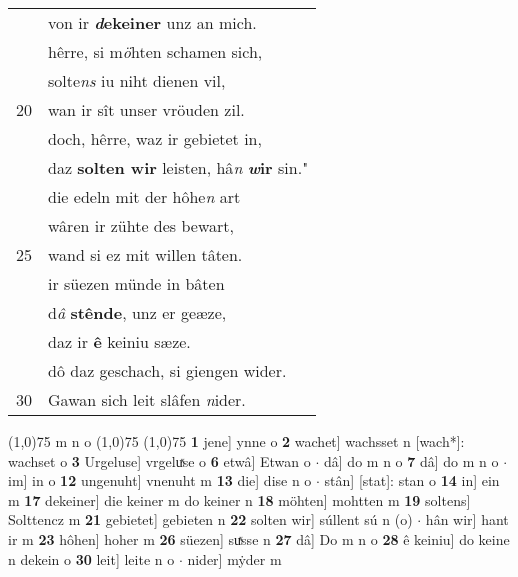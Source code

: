 \documentclass[8pt,a4paper,notitlepage]{article}
\begin{document}
\begin{table}[ht]
\begin{minipage}[t]{0.5\linewidth}
\begin{tabular}{rl}
 & von ir \textbf{\textit{d}ekeiner} unz an mich.\\ 
 & hêrre, si m\textit{ö}hten schamen sich,\\ 
 & solte\textit{ns} iu niht dienen vil,\\ 
20 & wan ir sît unser vröuden zil.\\ 
 & doch, hêrre, waz ir gebietet in,\\ 
 & daz \textbf{solten wir} leisten, hâ\textit{n} \textbf{\textit{w}ir} sin."\\ 
 & die edeln mit der hôhe\textit{n} art\\ 
 & wâren ir zühte des bewart,\\ 
25 & wand si ez mit willen tâten.\\ 
 & ir süezen münde in bâten\\ 
 & d\textit{â} \textbf{stênde}, unz er geæze,\\ 
 & daz ir \textbf{ê} keiniu sæze.\\ 
 & dô daz geschach, si giengen wider.\\ 
30 & Gawan sich leit slâfen \textit{n}ider.\\ 
\end{tabular}
\scriptsize
\line(1,0){75} \newline
m n o \newline
\line(1,0){75} \newline
\newline
\line(1,0){75} \newline
\textbf{1} jene] ynne o \textbf{2} wachet] wachsset n [wach*]: wachset o \textbf{3} Urgeluse] vrgeluͯse o \textbf{6} etwâ] Etwan o  $\cdot$ dâ] do m n o \textbf{7} dâ] do m n o  $\cdot$ im] in o \textbf{12} ungenuht] vnenuht m \textbf{13} die] dise n o  $\cdot$ stân] [stat]: stan o \textbf{14} in] ein m \textbf{17} dekeiner] die keiner m do keiner n \textbf{18} möhten] mohtten m \textbf{19} soltens] Solttencz m \textbf{21} gebietet] gebieten n \textbf{22} solten wir] súllent sú n (o)  $\cdot$ hân wir] hant ir m \textbf{23} hôhen] hoher m \textbf{26} süezen] suͯsse n \textbf{27} dâ] Do m n o \textbf{28} ê keiniu] do keine n dekein o \textbf{30} leit] leite n o  $\cdot$ nider] mẏder m \newline
\end{minipage}
\end{table}
\newpage
\end{document}
